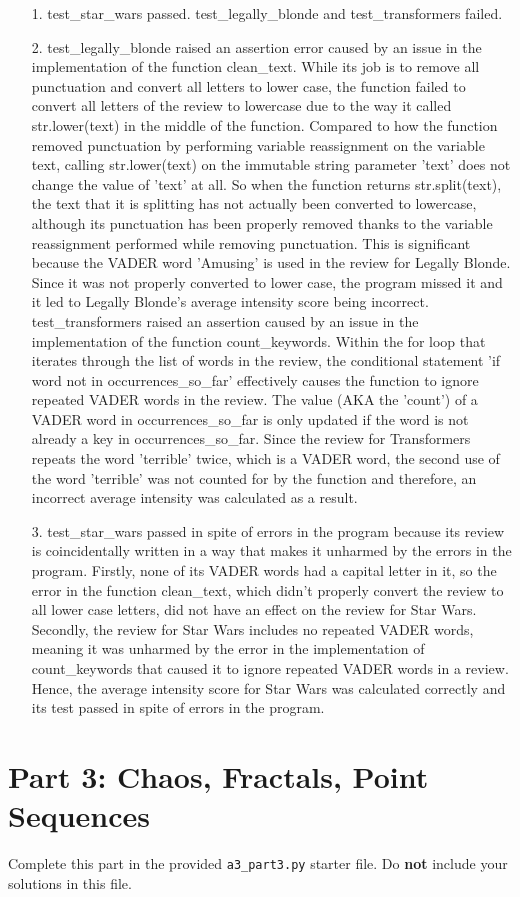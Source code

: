 \documentclass[11pt]{article}
\begin{document}
\begin{enumerate}
\item[1.]
test\_star\_wars passed. test\_legally\_blonde and test\_transformers failed. 

\item[2.]
test\_legally\_blonde raised an assertion error caused by an issue in the implementation of the function clean\_text. While its job is to remove all punctuation and convert all letters to lower case, the function failed to convert all letters of the review to lowercase due to the way it called str.lower(text) in the middle of the function. Compared to how the function removed punctuation by performing variable reassignment on the variable text, calling str.lower(text) on the immutable string parameter 'text' does not change the value of 'text' at all. So when the function returns str.split(text), the text that it is splitting has not actually been converted to lowercase, although its punctuation has been properly removed thanks to the variable reassignment performed while removing punctuation. This is significant because the VADER word 'Amusing' is used in the review for Legally Blonde. Since it was not properly converted to lower case, the program missed it and it led to Legally Blonde's average intensity score being incorrect. \\

test\_transformers raised an assertion caused by an issue in the implementation of the function count\_keywords. Within the for loop that iterates through the list of words in the review, the conditional statement 'if word not in occurrences\_so\_far' effectively causes the function to ignore repeated VADER words in the review. The value (AKA the 'count') of a VADER word in occurrences\_so\_far is only updated if the word is not already a key in occurrences\_so\_far. Since the review for Transformers repeats the word 'terrible' twice, which is a VADER word, the second use of the word 'terrible' was not counted for by the function and therefore, an incorrect average intensity was calculated as a result. 

\item[3.]
test\_star\_wars passed in spite of errors in the program because its review is coincidentally written in a way that makes it unharmed by the errors in the program. Firstly, none of its VADER words had a capital letter in it, so the error in the function clean\_text, which didn't properly convert the review to all lower case letters, did not have an effect on the review for Star Wars. Secondly, the review for Star Wars includes no repeated VADER words, meaning it was unharmed by the error in the implementation of count\_keywords that caused it to ignore repeated VADER words in a review. Hence, the average intensity score for Star Wars was calculated correctly and its test passed in spite of errors in the program.  
\end{enumerate}

\section*{Part 3: Chaos, Fractals, Point Sequences}

Complete this part in the provided \texttt{a3\_part3.py} starter file.
Do \textbf{not} include your solutions in this file.
\end{document}
